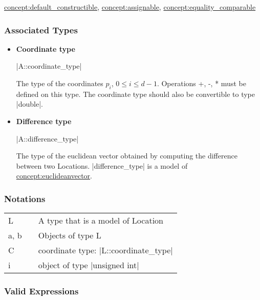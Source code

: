 \documentclass[12pt,twoside]{report}
\begin{document}
\hyperref{Default Constructible}{Default Constructible (see Section}{)}{concept:default_constructible}, \hyperref{Assignable}{Assignable (see Section}{)}{concept:assignable}, \hyperref{Equality Comparable}{Equality Comparable (see Section}{)}{concept:equality_comparable}



\htmlrule[CLEAR=all]  \subsubsection*{Associated Types}

\begin{itemize}
\item {\bf Coordinate type}

  |A::coordinate_type|

  The type of the coordinates $p_i$, \mbox{$0 \le i \le d-1$}. Operations +, -, * must be defined on this type. The coordinate type should also be convertible to type |double|.

\item {\bf Difference type}

  |A::difference_type|

  The type of the euclidean vector obtained by computing the difference between two Locations. |difference_type| is a model of \hyperref{Euclidean Vector}{Euclidean Vector (see Section }{)}{concept:euclideanvector}.

\end{itemize}




\htmlrule[CLEAR=all]  \subsubsection*{Notations}

\begin{tabular}[!h]{l l l}
L & & A type that is a model of Location\\
a, b & & Objects of type L\\
C & &  coordinate type: |L::coordinate_type|\\
i & & object of type |unsigned int|\\
\end{tabular}


\htmlrule[CLEAR=all]  \subsubsection*{Valid Expressions}
\end{document}
